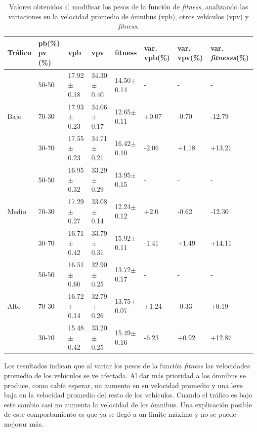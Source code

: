 \begin{table}[H]
	\renewcommand{\arraystretch}{1.2}
	\caption[Valores obtenidos al modificar los pesos de la función de \emph{fitness}.]{Valores obtenidos al modificar los pesos de la función de \emph{fitness}, analizando las variaciones en la velocidad promedio de ómnibus (vpb), otros vehículos (vpv) y \emph{fitness}. }
	\label{table:analisis_fitness}
	\centering
	\begin{tabular}{p{1cm}p{1.2cm}p{1.8cm}p{1.8cm}p{1.8cm}p{1.2cm}p{1.2cm}p{1.2cm} }
		\hline
		Tráfico &
		pb(\%) pv (\%)& 
		vpb & 
		vpv &
		fitness &
		var. \newline vpb(\%) &
		var. \newline vpv(\%) &
		var. \newline \emph{fitnesss}(\%)
		\\ 
		\hline
		& 50-50  & 17.92$\pm$0.18 & 34.30$\pm$0.40 & 14.50$\pm$0.14  &- & - & -\\		
		Bajo & 70-30  & 17.93$\pm$0.23 & 34.06$\pm$0.17 & 12.65$\pm$0.11  & +0.07 & -0.70 & -12.79\\		
		& 30-70 & 17.55$\pm$0.23 & 34.71$\pm$0.21 & 16.42$\pm$0.10  & -2.06 & +1.18 & +13.21\\
		\hline
		
		& 50-50  & 16.95$\pm$0.32 & 33.29$\pm$0.29 & 13.95$\pm$0.15  &- & - & -\\		
		Medio & 70-30  & 17.29$\pm$0.27 & 33.08$\pm$0.14 & 12.24$\pm$0.12  & +2.0 & -0.62 & -12.30\\		
		& 30-70 & 16.71$\pm$0.42 & 33.79$\pm$0.31 & 15.92$\pm$0.11  & -1.41 & +1.49& +14.11\\
		
		\hline
		& 50-50  & 16.51$\pm$0.60 & 32.90$\pm$0.25 & 13.72$\pm$0.17  &- & - & -\\		
		Alto & 70-30  & 16.72$\pm$0.14 & 32.79$\pm$0.26 & 13.75$\pm$0.07  & +1.24 & -0.33 & +0.19\\	
		& 30-70 & 15.48$\pm$0.42 & 33.20$\pm$0.25 & 15.49$\pm$0.16  & -6.23 & +0.92 & +12.87\\
		\hline
	\end{tabular}
\end{table}


Los resultados indican que al variar los pesos de la función \emph{fitness} las velocidades promedio de los vehículos se ve afectada. Al dar más prioridad a los ómnibus se produce, como cabía esperar, un aumento en su velocidad promedio y una leve baja en la velocidad promedio del resto de los vehículos. Cuando el tráfico es bajo este cambio casi no aumenta la velocidad de los ómnibus. Una explicación posible de este comportamiento es que ya se llegó a un limite máximo y no se puede mejorar más.

